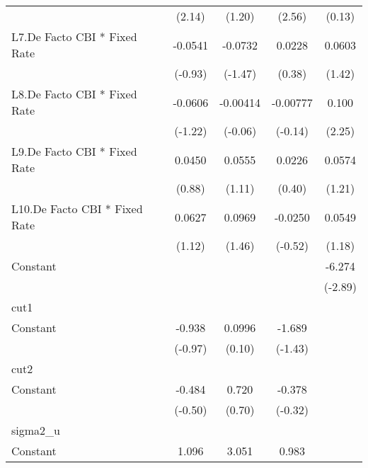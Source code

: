 {\begin{longtable}{l*{4}{c}}
                &   (2.14)         &   (1.20)         &   (2.56)         &   (0.13)         \\
[1em]
L7.De Facto CBI * Fixed Rate&  -0.0541         &  -0.0732         &   0.0228         &   0.0603         \\
                &  (-0.93)         &  (-1.47)         &   (0.38)         &   (1.42)         \\
[1em]
L8.De Facto CBI * Fixed Rate&  -0.0606         & -0.00414         & -0.00777         &    0.100\sym{*}  \\
                &  (-1.22)         &  (-0.06)         &  (-0.14)         &   (2.25)         \\
[1em]
L9.De Facto CBI * Fixed Rate&   0.0450         &   0.0555         &   0.0226         &   0.0574         \\
                &   (0.88)         &   (1.11)         &   (0.40)         &   (1.21)         \\
[1em]
L10.De Facto CBI * Fixed Rate&   0.0627         &   0.0969         &  -0.0250         &   0.0549         \\
                &   (1.12)         &   (1.46)         &  (-0.52)         &   (1.18)         \\
[1em]
Constant        &                  &                  &                  &   -6.274\sym{**} \\
                &                  &                  &                  &  (-2.89)         \\
\hline
cut1            &                  &                  &                  &                  \\
Constant        &   -0.938         &   0.0996         &   -1.689         &                  \\
                &  (-0.97)         &   (0.10)         &  (-1.43)         &                  \\
\hline
cut2            &                  &                  &                  &                  \\
Constant        &   -0.484         &    0.720         &   -0.378         &                  \\
                &  (-0.50)         &   (0.70)         &  (-0.32)         &                  \\
\hline
sigma2\_u        &                  &                  &                  &                  \\
Constant        &    1.096\sym{***}&    3.051\sym{***}&    0.983\sym{***}&                  \\

\end{longtable}}
